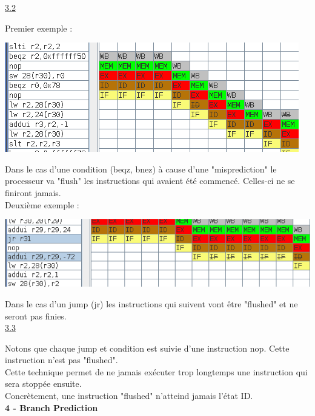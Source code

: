 \documentclass[a4paper,12pt]{article}
\begin{document}
	\underline{3.2}\\
		\par
		Premier exemple :
		\begin{center}
			\includegraphics[width=\linewidth * 2 / 3]{img/2}
		\end{center}
		Dans le cas d'une condition (beqz, bnez) à cause d'une "misprediction" le processeur va "flush" les instructions qui avaient été commencé.
		Celles-ci ne se finiront jamais.\\\break
		Deuxième exemple :
		\begin{center}
			\includegraphics[width=\linewidth * 3 / 4]{img/3}
		\end{center}
		Dans le cas d'un jump (jr) les instructions qui suivent vont être "flushed" et ne seront pas finies.\\

	\underline{3.3}\\
		\par
		Notons que chaque jump et condition est suivie d'une instruction nop. Cette instruction n'est pas "flushed".\\
		Cette technique permet de ne jamais exécuter trop longtemps une instruction qui sera stoppée ensuite.\\
		Concrètement, une instruction "flushed" n'atteind jamais l'état ID.\\

	\break
	\Large{\textbf{4 - Branch Prediction}}\\\break
	\small
\end{document}
